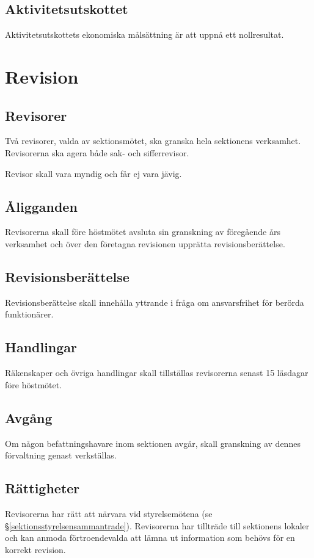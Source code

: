 \documentclass{datateknologsektionen-document}
\begin{document}
    \subsection{Aktivitetsutskottet}
      Aktivitetsutskottets ekonomiska målsättning är att uppnå ett nollresultat.

  \section{Revision}
    \subsection{Revisorer}
      Två revisorer, valda av sektionsmötet, ska granska hela sektionens verksamhet.
      Revisorerna ska agera både sak- och sifferrevisor.

      Revisor skall vara myndig och får ej vara jävig.
    \subsection{Åligganden}
      Revisorerna skall före höstmötet avsluta sin granskning av föregående års verksamhet
      och över den företagna revisionen upprätta revisionsberättelse.
    \subsection{Revisionsberättelse}
      Revisionsberättelse skall innehålla yttrande i fråga om ansvarsfrihet för berörda
      funktionärer.
    \subsection{Handlingar}
      Räkenskaper och övriga handlingar skall tillställas revisorerna senast 15 läsdagar före
      höstmötet.
    \subsection{Avgång}
      Om någon befattningshavare inom sektionen avgår, skall granskning av dennes
      förvaltning genast verkställas.
    \subsection{Rättigheter}
      Revisorerna har rätt att närvara vid styrelsemötena (se \S \ref{sektionsstyrelsensammantrade}). Revisorerna har tillträde till
      sektionens lokaler och kan anmoda förtroendevalda att lämna ut information som
      behövs för en korrekt revision.
\end{document}

